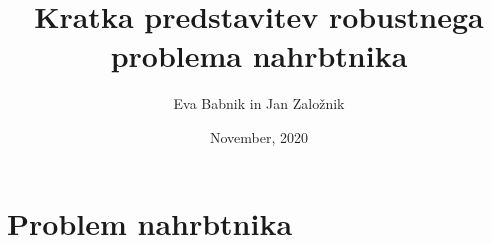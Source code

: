 \documentclass[a4paper,12pt]{article}
\begin{document}
\title{Kratka predstavitev robustnega problema nahrbtnika}
\author{Eva Babnik in Jan Založnik}
\date{November, 2020}
\maketitle


\newpage

\section{Problem nahrbtnika}
\end{document}
